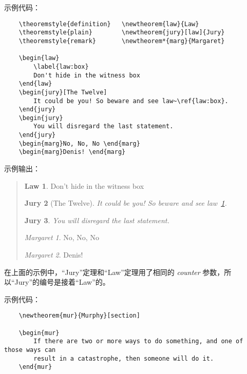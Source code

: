 \documentclass[UTF8]{ctexart}
\begin{document}
示例代码：
\begin{verbatim}
    \theoremstyle{definition}   \newtheorem{law}{Law}
    \theoremstyle{plain}        \newtheorem{jury}[law]{Jury}
    \theoremstyle{remark}       \newtheorem*{marg}{Margaret}

    \begin{law}
        \label{law:box}
        Don't hide in the witness box
    \end{law}
    \begin{jury}[The Twelve]
        It could be you! So beware and see law~\ref{law:box}.
    \end{jury}
    \begin{jury}
        You will disregard the last statement.
    \end{jury}
    \begin{marg}No, No, No \end{marg}
    \begin{marg}Denis! \end{marg}
\end{verbatim}

示例输出：
\begin{quote}
    \theoremstyle{definition}   \newtheorem{law}{Law}
    \theoremstyle{plain}        \newtheorem{jury}[law]{Jury}
    \theoremstyle{remark}       \newtheorem*{marg}{Margaret}

    \begin{law}
        \label{law:box}
        Don't hide in the witness box
    \end{law}
    \begin{jury}[The Twelve]
        It could be you! So beware and see law~\ref{law:box}.
    \end{jury}
    \begin{jury}
        You will disregard the last statement.
    \end{jury}
    \begin{marg}No, No, No \end{marg}
    \begin{marg}Denis! \end{marg}
\end{quote}

在上面的示例中，“Jury”定理和“Law”定理用了相同的 \emph{counter} 参数，所以“Jury”的编号是接着“Law”的。

示例代码：
\begin{verbatim}
    \newtheorem{mur}{Murphy}[section]

    \begin{mur}
        If there are two or more ways to do something, and one of those ways can
        result in a catastrophe, then someone will do it.
    \end{mur}
\end{verbatim}
\end{document}
